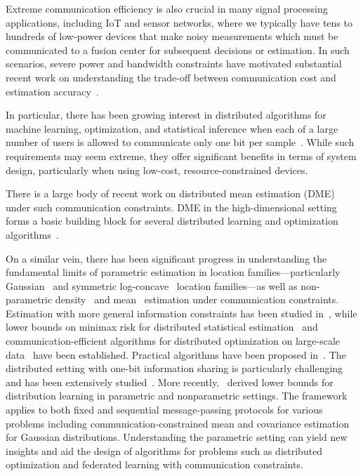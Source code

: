 \documentclass[10pt]{article} %
\theoremstyle{plain}
\theoremstyle{definition}
\theoremstyle{remark}
\begin{document}
Extreme communication efficiency is also crucial in many signal processing applications, including IoT and sensor networks, where we typically have tens to hundreds of low-power devices that make noisy measurements which must be communicated to a fusion center for subsequent decisions or estimation. In such scenarios, severe power and bandwidth constraints have motivated substantial recent work on understanding the trade-off between communication cost and estimation accuracy~\citep{heinzelman2000energy,ribeiro2006bandwidth,luo2005universal,BenBasat2024QuickDME}.  

In particular, there has been growing interest in distributed algorithms for machine learning, optimization, and statistical inference when each of a large number of users is allowed to communicate only one bit per sample~\citep{seide20141,zhu2021onebit,fan20221,tang20211}. While such requirements may seem extreme, they offer significant benefits in terms of system design, particularly when using low-cost, resource-constrained devices.  

There is a large body of recent work on distributed mean estimation (DME) under such communication constraints. DME in the high-dimensional setting forms a basic building block for several distributed learning and optimization algorithms~\citep{suresh2017distributed,amiraz2022distributed,liu2023communication}. 

On a similar vein, there has been significant progress in understanding the fundamental limits of parametric estimation in location families—particularly Gaussian~\citep{cai2022nonparametric,cai2024distributed} and symmetric log-concave~\citep{kipnis2022mean,ritesh} location families—as well as non-parametric density~\citep{acharya2023optimal} and mean~\citep{lau2025sequential1bitmeanestimation} estimation under communication constraints. Estimation with more general information constraints has been studied in~\citep{acharya2020inference1,acharya2020inference2,acharya2021inference3,Koltchinskii}, while lower bounds on minimax risk for distributed statistical estimation~\citep{zhang2013information} and communication-efficient algorithms for distributed optimization on large-scale data~\citep{zhang2012communication} have been established. Practical algorithms have been proposed in~\citep{battey2018distributed,deisenroth2015distributed}. The distributed setting with one-bit information sharing is particularly challenging and has been extensively studied~\citep{venkitasubramaniam2007quantization,chen2009performance}. 
More recently,~\citep{han2021geometric,barnes2020lower,rahmani2024fundamental,shah2025generalized} derived lower bounds for distribution learning in parametric and nonparametric settings. The framework applies to both fixed and sequential message-passing protocols for various problems including communication-constrained mean and covariance estimation for Gaussian distributions. 
Understanding the parametric setting can yield new insights and aid the design of algorithms for problems such as distributed optimization and federated learning with communication constraints. 
\end{document}
